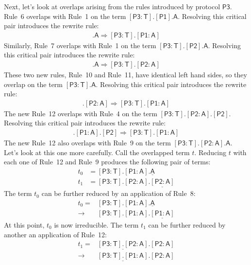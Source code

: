 \documentclass[a4paper,headsepline,bibliography=totoc,toc=flat,fleqn,twoside=semi]{scrbook}
\theoremstyle{definition}
\theoremstyle{definition}
\theoremstyle{definition}
\newcommand{\namesym}[1]{\mathsf{#1}}
\newcommand{\proto}[1]{\bm{\mathsf{#1}}}
\newcommand{\protosym}[1]{[\proto{#1}]}
\newcommand{\assocsym}[2]{[\proto{#1}\colon\namesym{#2}]}
\begin{document}
Next, let's look at overlaps arising from the rules introduced by protocol $\proto{P3}$. Rule~6 overlaps with Rule~1 on the term $\assocsym{P3}{T}.\protosym{P1}.\namesym{A}$. Resolving this critical pair introduces the rewrite rule:
\begin{align}
\assocsym{P3}{T}.\namesym{A}\Rightarrow\assocsym{P3}{T}.\assocsym{P1}{A}\tag{10}
\end{align}
Similarly, Rule~7 overlaps with Rule~1 on the term $\assocsym{P3}{T}.\protosym{P2}.\namesym{A}$. Resolving this critical pair introduces the rewrite rule:
\begin{align}
\assocsym{P3}{T}.\namesym{A}\Rightarrow\assocsym{P3}{T}.\assocsym{P2}{A}\tag{11}
\end{align}
These two new rules, Rule~10 and Rule~11, have identical left hand sides, so they overlap on the term $\assocsym{P3}{T}.\namesym{A}$. Resolving this critical pair introduces the rewrite rule:
\begin{align}
\assocsym{P3}{T}.\assocsym{P2}{A}\Rightarrow\assocsym{P3}{T}.\assocsym{P1}{A}\tag{12}
\end{align}
The new Rule~12 overlaps with Rule~4 on the term $\assocsym{P3}{T}.\assocsym{P2}{A}.\protosym{P2}$. Resolving this critical pair introduces the rewrite rule:
\begin{align}
\assocsym{P3}{T}.\assocsym{P1}{A}.\protosym{P2}\Rightarrow\assocsym{P3}{T}.\assocsym{P1}{A}\tag{13}
\end{align}
The new Rule~12 also overlaps with Rule~9 on the term $\assocsym{P3}{T}.\assocsym{P2}{A}.\namesym{A}$. Let's look at this one more carefully. Call the overlapped term $t$. Reducing $t$ with each one of Rule~12 and Rule~9 produces the following pair of terms:
\begin{align*}
t_0&=\assocsym{P3}{T}.\assocsym{P1}{A}.\underline{\namesym{A}}\\
t_1&=\assocsym{P3}{T}.\assocsym{P2}{A}.\underline{\assocsym{P2}{A}}
\end{align*}
The term $t_0$ can be further reduced by an application of Rule~8:
\begin{align*}
t_0=&\assocsym{P3}{T}.\assocsym{P1}{A}.\underline{\namesym{A}}\\
\rightarrow&\assocsym{P3}{T}.\assocsym{P1}{A}.\underline{\assocsym{P1}{A}}
\end{align*}
At this point, $t_0$ is now irreducible. The term $t_1$ can be further reduced by another an application of Rule~12:
\begin{align*}
t_1=&\underline{\assocsym{P3}{T}.\assocsym{P2}{A}}.\assocsym{P2}{A}\\
\rightarrow&\underline{\assocsym{P3}{T}.\assocsym{P1}{A}}.\assocsym{P2}{A}
\end{align*}
\end{document}
